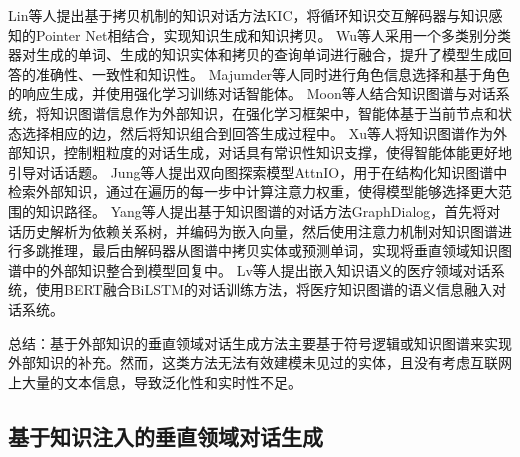 Lin等人\cite{DBLP:conf/acl/LinJHWC20}提出基于拷贝机制的知识对话方法KIC，将循环知识交互解码器与知识感知的Pointer Net相结合，实现知识生成和知识拷贝。
Wu等人\cite{DBLP:conf/acl/WuLZZW20}采用一个多类别分类器对生成的单词、生成的知识实体和拷贝的查询单词进行融合，提升了模型生成回答的准确性、一致性和知识性。
Majumder等人\cite{DBLP:conf/emnlp/MajumderJBM20}同时进行角色信息选择和基于角色的响应生成，并使用强化学习训练对话智能体。
Moon等人\cite{DBLP:conf/acl/MoonSKS19}结合知识图谱与对话系统，将知识图谱信息作为外部知识，在强化学习框架中，智能体基于当前节点和状态选择相应的边，然后将知识组合到回答生成过程中。
Xu等人\cite{DBLP:conf/acl/XuWNWCL20}将知识图谱作为外部知识，控制粗粒度的对话生成，对话具有常识性知识支撑，使得智能体能更好地引导对话话题。
Jung等人\cite{DBLP:conf/emnlp/JungSL20}提出双向图探索模型AttnIO，用于在结构化知识图谱中检索外部知识，通过在遍历的每一步中计算注意力权重，使得模型能够选择更大范围的知识路径。
Yang等人\cite{DBLP:conf/emnlp/YangZE20}提出基于知识图谱的对话方法GraphDialog，首先将对话历史解析为依赖关系树，并编码为嵌入向量，然后使用注意力机制对知识图谱进行多跳推理，最后由解码器从图谱中拷贝实体或预测单词，实现将垂直领域知识图谱中的外部知识整合到模型回复中。
Lv等人\cite{SJSJ202312037}提出嵌入知识语义的医疗领域对话系统，使用BERT融合BiLSTM的对话训练方法，将医疗知识图谱的语义信息融入对话系统。

总结：基于外部知识的垂直领域对话生成方法主要基于符号逻辑或知识图谱来实现外部知识的补充。然而，这类方法无法有效建模未见过的实体，且没有考虑互联网上大量的文本信息，导致泛化性和实时性不足。

\subsection{基于知识注入的垂直领域对话生成}

